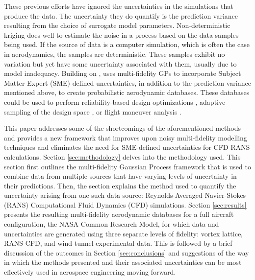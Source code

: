 These previous efforts have ignored the uncertainties in the simulations that produce the data. The uncertainty they do quantify is the prediction variance resulting from the choice of surrogate model parameters. Non-deterministic kriging \cite{bae_nondeterministic_2019} does well to estimate the noise in a process based on the data samples being used. If the source of data is a computer simulation, which is often the case in aerodynamics, the samples are deterministic. These samples exhibit no variation but yet have some uncertainty associated with them, usually due to model inadequacy. Building on \cite{huang_sequential_2006}, \cite{wendorff_combining_2016} uses multi-fidelity GPs to incorporate Subject Matter Expert (SME) defined uncertainties, in addition to the prediction variance mentioned above, to create probabilistic aerodynamic databases. These databases could be used to perform reliability-based design optimizations \cite{gaul_modified_2014}, adaptive sampling of the design space \cite{picheny_noisy_2014}, or flight maneuver analysis \cite{wendorff_combining_2016}.


This paper addresses some of the shortcomings of the aforementioned methods and provides a new framework that improves upon noisy multi-fidelity modelling techniques and eliminates the need for SME-defined uncertainties for CFD RANS calculations. Section \ref{sec:methodology} delves into the methodology used. This section first outlines the multi-fidelity Gaussian Process framework that is used to combine data from multiple sources that have varying levels of uncertainty in their predictions. Then, the section explains the method used to quantify the uncertainty arising from one such data source: Reynolds-Averaged Navier-Stokes (RANS) Computational Fluid Dynamics (CFD) simulations. Section \ref{sec:results} presents the resulting multi-fidelity aerodynamic databases for a full aircraft configuration, the NASA Common Research Model, for which data and uncertainties are generated using three separate levels of fidelity: vortex lattice, RANS CFD, and wind-tunnel experimental data. This is followed by a brief discussion of the outcomes in Section \ref{sec:conclusions} and suggestions of the way in which the methods presented and their associated uncertainties can be most effectively used in aerospace engineering moving forward.